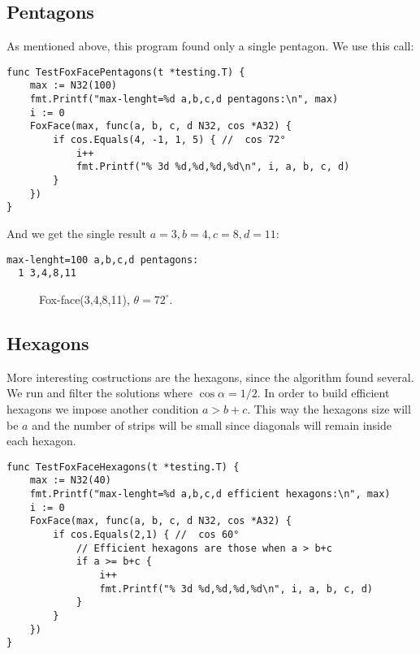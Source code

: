 \documentclass[11pt]{article}
\begin{document}
\subsection{Pentagons}
As mentioned above, this program found only a single pentagon. We use this call:
\begin{lstlisting}
func TestFoxFacePentagons(t *testing.T) {
	max := N32(100)
	fmt.Printf("max-lenght=%d a,b,c,d pentagons:\n", max)
	i := 0
	FoxFace(max, func(a, b, c, d N32, cos *A32) {
		if cos.Equals(4, -1, 1, 5) { //  cos 72°
			i++
			fmt.Printf("% 3d %d,%d,%d,%d\n", i, a, b, c, d)
		}
	})
}
\end{lstlisting}
And we get the single result $a=3, b=4, c=8, d=11$:
\begin{lstlisting}
max-lenght=100 a,b,c,d pentagons:
  1 3,4,8,11
\end{lstlisting}

\begin{figure}[h!]
\centering
{}
\caption{Fox-face(3,4,8,11), $\theta=72^\circ$.}
\end{figure}


\subsection{Hexagons}
More interesting costructions are the hexagons, since the algorithm found several.
We run and filter the solutions where $\cos{\alpha} = 1/2$. In order to build efficient
hexagons we impose another condition $a > b+c$. This way the hexagons size will be $a$
and the number of strips will be small since diagonals will remain inside each hexagon.

\begin{lstlisting}
func TestFoxFaceHexagons(t *testing.T) {
	max := N32(40)
	fmt.Printf("max-lenght=%d a,b,c,d efficient hexagons:\n", max)
	i := 0
	FoxFace(max, func(a, b, c, d N32, cos *A32) {
		if cos.Equals(2,1) { //  cos 60°
			// Efficient hexagons are those when a > b+c
			if a >= b+c {
				i++
				fmt.Printf("% 3d %d,%d,%d,%d\n", i, a, b, c, d)
			}
		}
	})
}
\end{lstlisting}
\end{document}
